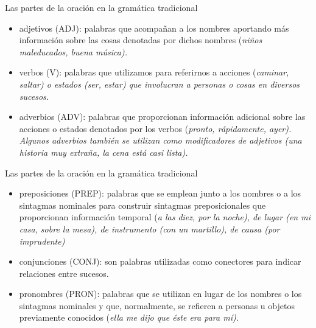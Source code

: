 \documentclass{beamer}
\begin{document}
\begin{frame}{Las partes de la oración en la gramática tradicional}

\begin{itemize}
    \item adjetivos (ADJ): palabras que acompañan a los nombres aportando más información sobre las cosas denotadas por dichos nombres (\it{niños maleducados, buena música}). 
    \item verbos (V): palabras que utilizamos para referirnos a acciones (\it{caminar, saltar}) o  estados (\it{ser, estar}) que involucran a personas o cosas en diversos sucesos.
    \item adverbios (ADV): palabras que proporcionan información adicional sobre las acciones o estados denotados por los verbos (\it{pronto, rápidamente, ayer}). Algunos adverbios también se utilizan como modificadores de adjetivos (\it{una historia muy extraña, la cena está casi lista}).
\end{itemize}
\end{frame}

\begin{frame}{Las partes de la oración en la gramática tradicional}

\begin{itemize}
    \item preposiciones (PREP): palabras que se emplean junto a los nombres o a los sintagmas nominales para construir sintagmas preposicionales que proporcionan información temporal (\it{a las diez, por la noche}), de lugar (\it{en mi casa, sobre la mesa}), de instrumento (\it{con un martillo}), de causa (\it{por imprudente})
    \item conjunciones (CONJ): son palabras utilizadas como conectores para indicar relaciones entre sucesos.    
    \item pronombres (PRON): palabras que se utilizan en lugar de los nombres o los sintagmas nominales y que, normalmente, se refieren a personas u objetos previamente conocidos (\it{ella me dijo que éste era para mí}).
\end{itemize}
\end{frame}
\end{document}
